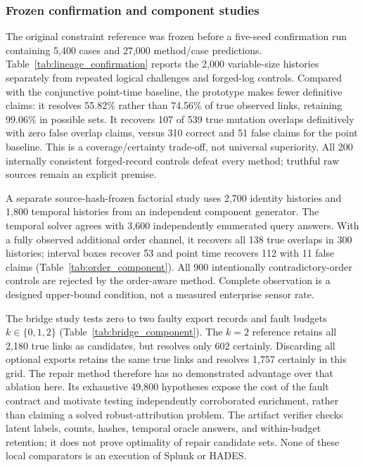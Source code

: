 \subsubsection{Frozen confirmation and component studies}
The original constraint reference was frozen before a five-seed confirmation run containing 5,400 cases and 27,000 method/case predictions. Table~\ref{tab:lineage_confirmation} reports the 2,000 variable-size histories separately from repeated logical challenges and forged-log controls. Compared with the conjunctive point-time baseline, the prototype makes fewer definitive claims: it resolves 55.82\% rather than 74.56\% of true observed links, retaining 99.06\% in possible sets. It recovers 107 of 539 true mutation overlaps definitively with zero false overlap claims, versus 310 correct and 51 false claims for the point baseline. This is a coverage/certainty trade-off, not universal superiority. All 200 internally consistent forged-record controls defeat every method; truthful raw sources remain an explicit premise.

A separate source-hash-frozen factorial study uses 2,700 identity histories and 1,800 temporal histories from an independent component generator. The temporal solver agrees with 3,600 independently enumerated query answers. With a fully observed additional order channel, it recovers all 138 true overlaps in 300 histories; interval boxes recover 53 and point time recovers 112 with 11 false claims (Table~\ref{tab:order_component}). All 900 intentionally contradictory-order controls are rejected by the order-aware method. Complete observation is a designed upper-bound condition, not a measured enterprise sensor rate.

The bridge study tests zero to two faulty export records and fault budgets $k\in\{0,1,2\}$ (Table~\ref{tab:bridge_component}). The $k=2$ reference retains all 2,180 true links as candidates, but resolves only 602 certainly. Discarding all optional exports retains the same true links and resolves 1,757 certainly in this grid. The repair method therefore has no demonstrated advantage over that ablation here. Its exhaustive 49,800 hypotheses expose the cost of the fault contract and motivate testing independently corroborated enrichment, rather than claiming a solved robust-attribution problem. The artifact verifier checks latent labels, counts, hashes, temporal oracle answers, and within-budget retention; it does not prove optimality of repair candidate sets. None of these local comparators is an execution of Splunk or HADES.

